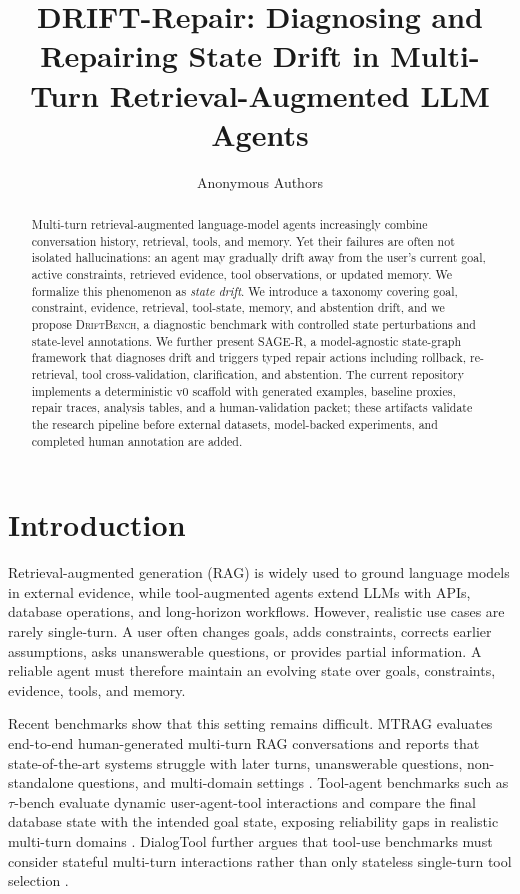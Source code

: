 \documentclass[letterpaper]{article}
\title{DRIFT-Repair: Diagnosing and Repairing State Drift in Multi-Turn Retrieval-Augmented LLM Agents}
\author{Anonymous Authors}
\date{}
\begin{document}
\maketitle

\begin{abstract}
Multi-turn retrieval-augmented language-model agents increasingly combine conversation history, retrieval, tools, and memory. Yet their failures are often not isolated hallucinations: an agent may gradually drift away from the user's current goal, active constraints, retrieved evidence, tool observations, or updated memory. We formalize this phenomenon as \emph{state drift}. We introduce a taxonomy covering goal, constraint, evidence, retrieval, tool-state, memory, and abstention drift, and we propose \textsc{DriftBench}, a diagnostic benchmark with controlled state perturbations and state-level annotations. We further present \textsc{SAGE-R}, a model-agnostic state-graph framework that diagnoses drift and triggers typed repair actions including rollback, re-retrieval, tool cross-validation, clarification, and abstention. The current repository implements a deterministic v0 scaffold with generated examples, baseline proxies, repair traces, analysis tables, and a human-validation packet; these artifacts validate the research pipeline before external datasets, model-backed experiments, and completed human annotation are added.
\end{abstract}

\section{Introduction}

Retrieval-augmented generation (RAG) is widely used to ground language models in external evidence, while tool-augmented agents extend LLMs with APIs, database operations, and long-horizon workflows. However, realistic use cases are rarely single-turn. A user often changes goals, adds constraints, corrects earlier assumptions, asks unanswerable questions, or provides partial information. A reliable agent must therefore maintain an evolving state over goals, constraints, evidence, tools, and memory.

Recent benchmarks show that this setting remains difficult. MTRAG evaluates end-to-end human-generated multi-turn RAG conversations and reports that state-of-the-art systems struggle with later turns, unanswerable questions, non-standalone questions, and multi-domain settings \cite{mtrag2025}. Tool-agent benchmarks such as $\tau$-bench evaluate dynamic user-agent-tool interactions and compare the final database state with the intended goal state, exposing reliability gaps in realistic multi-turn domains \cite{taubench2024}. DialogTool further argues that tool-use benchmarks must consider stateful multi-turn interactions rather than only stateless single-turn tool selection \cite{dialogtool2025}.
\end{document}
